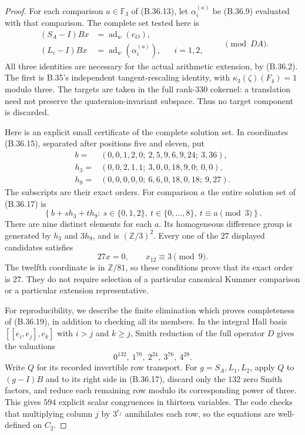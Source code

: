 \begin{proof}
For each comparison $a\in\mathbb F_3$ of (B.36.13),
let $\alpha_i^{(a)}$ be (B.36.9) evaluated with that
comparison. The complete set tested here is
\[
 \begin{aligned}
 (S_A-I)Bx&=\operatorname{ad}_w(e_O),\\
 (L_i-I)Bx&=\operatorname{ad}_w(\alpha_i^{(a)}),
                &&i=1,2,
 \end{aligned}
 \qquad\pmod{DA}.                                          \tag{B.36.17}
\]
All three identities are necessary for the actual
arithmetic extension, by (B.36.2). The first is B.35's
independent tangent-rescaling identity, with
$\kappa_3(\zeta)(F_4)=1$ modulo three.
The targets are taken in the full rank-$330$ cokernel:
a translation need not preserve the quaternion-invariant
subspace. Thus no target component is discarded.

Here is an explicit small certificate of the complete
solution set. In coordinates (B.36.15), separated after
positions five and eleven, put
\[
 \begin{aligned}
 b={}&(0,0,1,2,0;\ 2,5,9,6,9,24;\ 3,36),\\
 h_3={}&(0,0,2,1,1;\ 3,0,0,18,9,0;\ 0,0),\\
 h_9={}&(0,0,0,0,0;\ 6,6,0,18,0,18;\ 9,27).
 \end{aligned}                                               \tag{B.36.18}
\]
The subscripts are their exact orders. For comparison
$a$ the entire solution set of (B.36.17) is
\[
 \left\{b+s h_3+t h_9:\ s\in\{0,1,2\},\
               t\in\{0,\ldots,8\},\ t\equiv a\pmod3\right\}.
                                                               \tag{B.36.19}
\]
There are nine distinct elements for each $a$.
Its homogeneous difference group is generated by $h_3$
and $3h_9$, and is $(\mathbb Z/3)^2$.
Every one of the $27$ displayed candidates satisfies
\[
                         27x=0,\qquad x_{12}\equiv3\pmod9.
                                                               \tag{B.36.20}
\]
The twelfth coordinate is in $\mathbb Z/81$, so these
conditions prove that its exact order is $27$.
They do not require selection of a particular canonical
Kummer comparison or a particular extension representative.

For reproducibility, we describe the finite elimination
which proves completeness of (B.36.19), in addition to
checking all its members. In the integral Hall basis
$[[e_i,e_j],e_k]$ with $i>j$ and $k\ge j$, Smith reduction
of the full operator $D$ gives the valuations
\[
                      0^{132},\ 1^{70},\ 2^{24},\ 3^{76},\ 4^{28}.
                                                               \tag{B.36.21}
\]
Write $Q$ for its recorded invertible row transport.
For $g=S_A,L_1,L_2$, apply $Q$ to $(g-I)B$ and to its
right side in (B.36.17), discard only the $132$ zero
Smith factors, and reduce each remaining row modulo
its corresponding power of three. This gives $594$
explicit scalar congruences in thirteen variables.
The code checks that multiplying column $j$ by $3^{e_j}$
annihilates each row, so the equations are well-defined
on $C_2$.


\end{proof}
